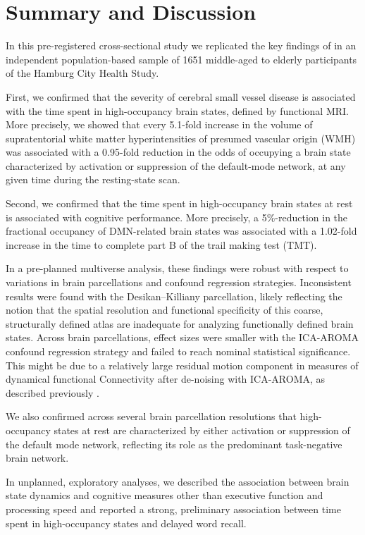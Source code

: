 \section{Summary and Discussion} \label{discussion}

In this pre-registered cross-sectional study we replicated the key findings of \cite{Schlemm2022-he} in an independent population-based sample of \num{1651} middle-aged to elderly participants of the Hamburg City Health Study.

First, we confirmed that the severity of cerebral small vessel disease is associated with the time spent in high-occupancy brain states, deﬁned by functional MRI.
More precisely, we showed that every 5.1-fold increase in the volume of supratentorial white matter hyperintensities of presumed vascular origin (WMH) was associated with a 0.95-fold reduction in the odds of occupying a brain state characterized by activation or suppression of the default-mode network, at any given time during the resting-state scan.

Second, we confirmed that the time spent in high-occupancy brain states at rest is associated with cognitive performance. 
More precisely, a 5\%-reduction in the fractional occupancy of DMN-related brain states was associated with a \num{1.02}-fold increase in the time to complete part B of the trail making test (TMT).

In a pre-planned multiverse analysis, these findings were robust with respect to variations in brain parcellations and confound regression strategies. Inconsistent results were found with the Desikan--Killiany parcellation, likely reflecting the notion that the spatial resolution and functional specificity of this coarse, structurally defined atlas are inadequate for analyzing functionally defined brain states.  Across brain parcellations, effect sizes  were smaller with the ICA-AROMA confound regression strategy and failed to reach nominal statistical significance. This might be due to a relatively large residual motion component in measures of dynamical functional Connectivity after de-noising with ICA-AROMA, as described previously \citep{lydon2019evaluation}.

We also confirmed across several brain parcellation resolutions that high-occupancy states at rest are characterized by either activation or suppression of the default mode network, reflecting its role as the predominant task-negative brain network.

In unplanned, exploratory analyses, we described the association between brain state dynamics and cognitive measures other than executive function and processing speed and reported a strong, preliminary association between time spent in high-occupancy states and delayed word recall.

